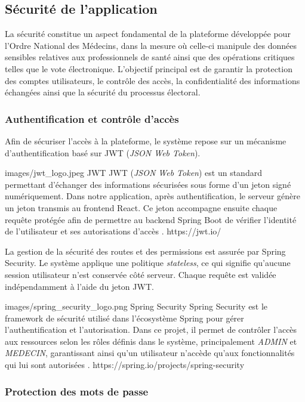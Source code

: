 ﻿\documentclass[12pt,a4paper]{report}
\begin{document}
\subsection{Sécurité de l'application}

La sécurité constitue un aspect fondamental de la plateforme développée pour
l’Ordre National des Médecins, dans la mesure où celle-ci manipule des données
sensibles relatives aux professionnels de santé ainsi que des opérations
critiques telles que le vote électronique. L’objectif principal est de garantir
la protection des comptes utilisateurs, le contrôle des accès, la
confidentialité des informations échangées ainsi que la sécurité du processus
électoral.

\subsubsection{Authentification et contrôle d'accès}

Afin de sécuriser l’accès à la plateforme, le système repose sur un mécanisme
d’authentification basé sur JWT (\textit{JSON Web Token}).

\techno
{images/jwt_logo.jpeg}
{JWT}
{JWT (\textit{JSON Web Token}) est un standard permettant d’échanger des
informations sécurisées sous forme d’un jeton signé numériquement. Dans notre
application, après authentification, le serveur génère un jeton transmis au
frontend React. Ce jeton accompagne ensuite chaque requête protégée afin de
permettre au backend Spring Boot de vérifier l’identité de l’utilisateur et
ses autorisations d’accès \cite{jwtRFC}.}
{https://jwt.io/}

La gestion de la sécurité des routes et des permissions est assurée par Spring
Security. Le système applique une politique \textit{stateless}, ce qui signifie
qu’aucune session utilisateur n’est conservée côté serveur. Chaque requête est
validée indépendamment à l’aide du jeton JWT.

\techno
{images/spring_security_logo.png}
{Spring Security}
{Spring Security est le framework de sécurité utilisé dans l’écosystème Spring
pour gérer l’authentification et l’autorisation. Dans ce projet, il permet de
contrôler l’accès aux ressources selon les rôles définis dans le système,
principalement \textit{ADMIN} et \textit{MEDECIN}, garantissant ainsi qu’un
utilisateur n’accède qu’aux fonctionnalités qui lui sont autorisées
\cite{springSecurityDocs}.}
{https://spring.io/projects/spring-security}

\subsubsection{Protection des mots de passe}
\end{document}
